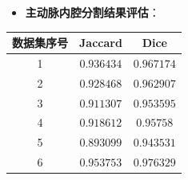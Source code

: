 \begin{frame}
\begin{itemize}
  \item \textbf{主动脉内腔分割结果评估}：
\end{itemize}
\begin{table}[t]
\renewcommand{\arraystretch}{0.5}
\centering
\begin{tabular*}{75mm}{c c c}
\toprule
\hspace{2mm} \small{数据集序号}  & \hspace{2mm} \small{Jaccard}    & \hspace{2mm} \small{Dice}       \\
\midrule
\hspace{2mm} \small{1}           & \hspace{2mm} \small{$0.936434$} & \hspace{2mm} \small{$0.967174$} \\
\midrule
\hspace{2mm} \small{2}           & \hspace{2mm} \small{$0.928468$} & \hspace{2mm} \small{$0.962907$} \\
\midrule
\hspace{2mm} \small{3}           & \hspace{2mm} \small{$0.911307$} & \hspace{2mm} \small{$0.953595$} \\
\midrule
\hspace{2mm} \small{4}           & \hspace{2mm} \small{$0.918612$} & \hspace{2mm} \small{$0.95758$} \\
\midrule
\hspace{2mm} \small{5}           & \hspace{2mm} \small{$0.893099$} & \hspace{2mm} \small{$0.943531$} \\
\midrule
\hspace{2mm} \small{6}           & \hspace{2mm} \small{$0.953753$} & \hspace{2mm} \small{$0.976329$} \\

\end{tabular*}
\end{table}
\end{frame}
